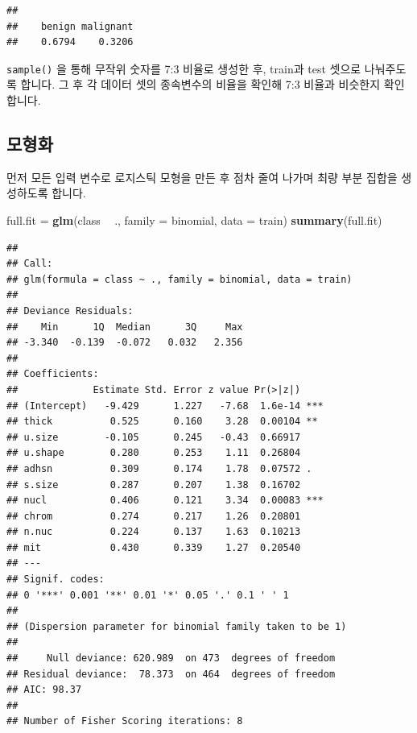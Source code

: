 \documentclass[12pt,]{book}
\newenvironment{Shaded}{\begin{snugshade}}{\end{snugshade}}
\newcommand{\DataTypeTok}[1]{\textcolor[rgb]{0.13,0.29,0.53}{#1}}
\newcommand{\KeywordTok}[1]{\textcolor[rgb]{0.13,0.29,0.53}{\textbf{#1}}}
\newcommand{\NormalTok}[1]{#1}
\newcommand{\OperatorTok}[1]{\textcolor[rgb]{0.81,0.36,0.00}{\textbf{#1}}}
\newcommand{\StringTok}[1]{\textcolor[rgb]{0.31,0.60,0.02}{#1}}
\begin{document}
\begin{verbatim}
## 
##    benign malignant 
##    0.6794    0.3206
\end{verbatim}

\texttt{sample()} 을 통해 무작위 숫자를 7:3 비율로 생성한 후, train과 test 셋으로 나눠주도록 합니다. 그 후 각 데이터 셋의 종속변수의 비율을 확인해 7:3 비율과 비슷한지 확인합니다.

\hypertarget{uxbaa8uxd615uxd654}{%
\subsection{모형화}\label{uxbaa8uxd615uxd654}}

먼저 모든 입력 변수로 로지스틱 모형을 만든 후 점차 줄여 나가며 최량 부분 집합을 생성하도록 합니다.

\begin{Shaded}
\begin{Highlighting}[]
\NormalTok{full.fit =}\StringTok{ }\KeywordTok{glm}\NormalTok{(class }\OperatorTok{~}\StringTok{ }\NormalTok{., }\DataTypeTok{family =}\NormalTok{ binomial, }\DataTypeTok{data =}\NormalTok{ train)}
\KeywordTok{summary}\NormalTok{(full.fit)}
\end{Highlighting}
\end{Shaded}

\begin{verbatim}
## 
## Call:
## glm(formula = class ~ ., family = binomial, data = train)
## 
## Deviance Residuals: 
##    Min      1Q  Median      3Q     Max  
## -3.340  -0.139  -0.072   0.032   2.356  
## 
## Coefficients:
##             Estimate Std. Error z value Pr(>|z|)    
## (Intercept)   -9.429      1.227   -7.68  1.6e-14 ***
## thick          0.525      0.160    3.28  0.00104 ** 
## u.size        -0.105      0.245   -0.43  0.66917    
## u.shape        0.280      0.253    1.11  0.26804    
## adhsn          0.309      0.174    1.78  0.07572 .  
## s.size         0.287      0.207    1.38  0.16702    
## nucl           0.406      0.121    3.34  0.00083 ***
## chrom          0.274      0.217    1.26  0.20801    
## n.nuc          0.224      0.137    1.63  0.10213    
## mit            0.430      0.339    1.27  0.20540    
## ---
## Signif. codes:  
## 0 '***' 0.001 '**' 0.01 '*' 0.05 '.' 0.1 ' ' 1
## 
## (Dispersion parameter for binomial family taken to be 1)
## 
##     Null deviance: 620.989  on 473  degrees of freedom
## Residual deviance:  78.373  on 464  degrees of freedom
## AIC: 98.37
## 
## Number of Fisher Scoring iterations: 8
\end{verbatim}
\end{document}
